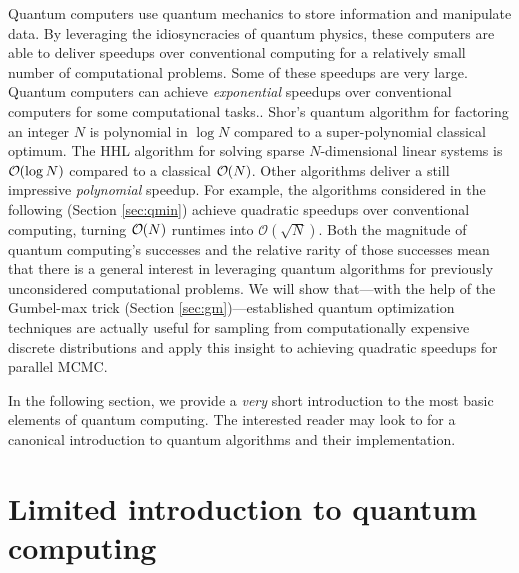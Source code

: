 \documentclass[12pt]{article} %
\newcommand{\order}[1]{{\cal O}\hspace{-0.2em}\left( #1 \right)}
\begin{document}
Quantum computers use quantum mechanics to store information and manipulate data. By leveraging the idiosyncracies of quantum physics, these computers are able to deliver speedups over conventional computing for a relatively small number of computational problems. Some of these speedups are very large. Quantum computers can achieve \emph{exponential} speedups over conventional computers for some computational tasks..  Shor's quantum algorithm for factoring an integer $N$ \citep{shor} is polynomial in $\log N$ compared to a super-polynomial classical optimum. The HHL algorithm for solving sparse $N$-dimensional linear systems \citep{harrow2009quantum} is $\order{\log N}$ compared to a classical $\order{N}$. Other algorithms deliver a still impressive \emph{polynomial} speedup.  For example, the algorithms considered in the following (Section \ref{sec:qmin}) achieve quadratic speedups over conventional computing, turning  $\order{N}$ runtimes into $\mathcal{O}(\sqrt{ N})$.  
 Both the magnitude of quantum computing's successes and the relative rarity of those successes mean that there is a general interest in leveraging quantum algorithms for previously unconsidered computational problems.  We will show that---with the help of the Gumbel-max trick (Section \ref{sec:gm})---established quantum optimization techniques are actually useful for sampling from computationally expensive discrete distributions and apply this insight to achieving quadratic speedups for parallel MCMC. 

In the following section, we provide a \emph{very} short introduction to the most basic elements of quantum computing. The interested reader may look to \citet{nielsen2002quantum} for a canonical introduction to quantum algorithms and their implementation.




\section{Limited introduction to quantum computing}\label{sec:shortIntro}
\end{document}
